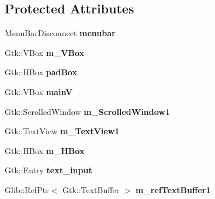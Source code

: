 \subsection*{Protected Attributes}
\begin{DoxyCompactItemize}
\item 
\hypertarget{classGameWindow_a0a2cc5e0c631c80db7e93a27df9c2aa0}{Menu\-Bar\-Disconnect {\bfseries menubar}}\label{classGameWindow_a0a2cc5e0c631c80db7e93a27df9c2aa0}

\item 
\hypertarget{classGameWindow_a3caa99f7bcc9224449fd803bf80914e5}{Gtk\-::\-V\-Box {\bfseries m\-\_\-\-V\-Box}}\label{classGameWindow_a3caa99f7bcc9224449fd803bf80914e5}

\item 
\hypertarget{classGameWindow_a22ad7c38de3fa392fea3a61620070cb6}{Gtk\-::\-H\-Box {\bfseries pad\-Box}}\label{classGameWindow_a22ad7c38de3fa392fea3a61620070cb6}

\item 
\hypertarget{classGameWindow_aa42a4efd2b698160715828bb6f475ded}{Gtk\-::\-V\-Box {\bfseries main\-V}}\label{classGameWindow_aa42a4efd2b698160715828bb6f475ded}

\item 
\hypertarget{classGameWindow_aa664f8ee7000541aaa15b0064f88334f}{Gtk\-::\-Scrolled\-Window {\bfseries m\-\_\-\-Scrolled\-Window1}}\label{classGameWindow_aa664f8ee7000541aaa15b0064f88334f}

\item 
\hypertarget{classGameWindow_a9fd4b685bf00fc8b671973f2d034cc14}{Gtk\-::\-Text\-View {\bfseries m\-\_\-\-Text\-View1}}\label{classGameWindow_a9fd4b685bf00fc8b671973f2d034cc14}

\item 
\hypertarget{classGameWindow_abcaa6ff85393398d6333c2e71e840255}{Gtk\-::\-H\-Box {\bfseries m\-\_\-\-H\-Box}}\label{classGameWindow_abcaa6ff85393398d6333c2e71e840255}

\item 
\hypertarget{classGameWindow_ab57509e4b69cb9f7b94df23fa8c5164e}{Gtk\-::\-Entry {\bfseries text\-\_\-input}}\label{classGameWindow_ab57509e4b69cb9f7b94df23fa8c5164e}

\item 
\hypertarget{classGameWindow_afa7b1828170515c768052dd85181f4c3}{Glib\-::\-Ref\-Ptr$<$ Gtk\-::\-Text\-Buffer $>$ {\bfseries m\-\_\-ref\-Text\-Buffer1}}\label{classGameWindow_afa7b1828170515c768052dd85181f4c3}


\end{DoxyCompactItemize}
